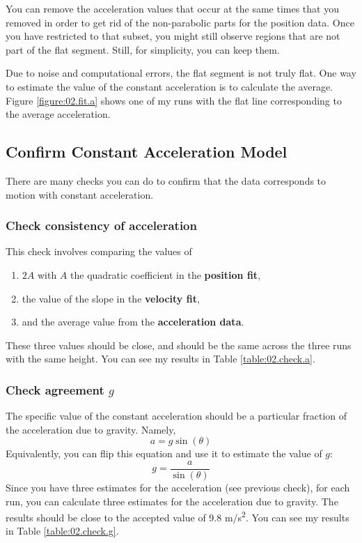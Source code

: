 You can remove the acceleration values that occur at the same times that you removed in order to get rid of the non-parabolic parts for the position data. Once you have restricted to that subset, you might still observe regions that are not part of the flat segment. Still, for simplicity, you can keep them.

Due to noise and computational errors, the flat segment is not truly flat. One way to estimate the value of the constant acceleration is to calculate the average. Figure \ref{figure:02.fit.a} shows one of my runs with the flat line corresponding to the average acceleration. 
%
\subsection{Confirm Constant Acceleration Model}
%
There are many checks you can do to confirm that the data corresponds to motion with constant acceleration.
%
\subsubsection{Check consistency of acceleration}
%
This check involves comparing the values of
\begin{enumerate}
    \item $2A$ with $A$ the quadratic coefficient in the \textbf{position fit},
    \item the value of the slope in the \textbf{velocity fit},
    \item and the average value from the \textbf{acceleration data}.
\end{enumerate}
These three values should be close, and should be the same across the three runs with the same height. You can see my results in Table \ref{table:02.check.a}.
%
\subsubsection{Check agreement $g$}
%
The specific value of the constant acceleration should be a particular fraction of the acceleration due to gravity. Namely,
\begin{equation}
    a = g \sin(\theta)
\end{equation}
Equivalently, you can flip this equation and use it to estimate the value of $g$:
\begin{equation}
    g = \frac{a}{\sin(\theta)}
\end{equation}
Since you have three estimates for the acceleration (see previous check), for each run, you can calculate three estimates for the acceleration due to gravity. The results should be close to the accepted value of 9.8 m/s\textsuperscript{2}. You can see my results in Table \ref{table:02.check.g}.
%
